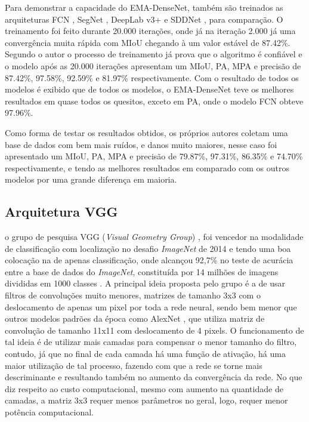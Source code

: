 Para demonstrar a capacidade do EMA-DenseNet, também são treinados as arquiteturas FCN \cite{yang2018automatic}, SegNet \cite{badrinarayanan2017segnet}, DeepLab v3+ \cite{chen2018encoder} e SDDNet \cite{choi2019sddnet}, para comparação. O treinamento  foi feito durante 20.000 iterações, onde já na iteração 2.000 já uma convergência muita rápida com MIoU chegando à um valor estável de 87.42\%. Segundo o autor o processo de treinamento já prova que o algoritmo é confiável e o modelo após as 20.000 iterações apresentam um MIoU, PA, MPA e precisão de 87.42\%, 97.58\%, 92.59\% e 81.97\% respectivamente. Com o resultado de todos os modelos é exibido que de todos os modelos, o EMA-DenseNet teve os melhores resultados em quase todos os quesitos, exceto em PA, onde o modelo FCN obteve 97.96\%.

Como forma de testar os resultados obtidos, os próprios autores coletam uma base de dados com bem mais ruídos, e danos muito maiores, nesse caso foi apresentado um MIoU, PA, MPA e precisão de 79.87\%, 97.31\%, 86.35\% e 74.70\% respectivamente, e tendo as melhores resultados em comparado com os outros modelos por uma grande diferença em maioria.

\subsection{Arquitetura VGG}
o grupo de pesquisa VGG (\textit{Visual Geometry Group}) \cite{simonyan2014very}, foi vencedor na modalidade de classificação com localização no desafio \textit{ImageNet} de 2014 e tendo uma boa colocação na de apenas classificação, onde alcançou 92,7\% no teste de acurácia entre a base de dados do \textit{ImageNet}, constituída por 14 milhões de imagens divididas em 1000 classes \cite{ILSVRC15}. 
A principal ideia proposta pelo grupo é a de usar filtros de convoluções muito menores, matrizes de tamanho 3x3 com o deslocamento de apenas um pixel por toda a rede neural, sendo bem menor que outros modelos padrões da época como AlexNet \cite{krizhevsky2017imagenet}, que utiliza matriz de convolução de tamanho 11x11 com deslocamento de 4 pixels.
O funcionamento de tal ideia é de utilizar mais camadas para compensar o menor tamanho do filtro, contudo, já que no final de cada camada há uma função de ativação, há uma maior utilização de tal processo, fazendo com que a rede se torne mais descriminante e resultando também no aumento da convergência da rede.
No que diz respeito ao custo computacional, mesmo com aumento na quantidade de camadas, a matriz 3x3 requer menos parâmetros no geral, logo, requer menor potência computacional\cite{GreatLearningVgg16}.

